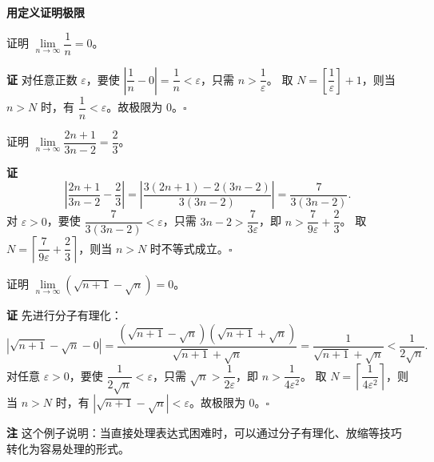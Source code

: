 \documentclass[fontset=fandol]{ctexart}
\newenvironment{custom}[1]{\par\noindent\textbf{#1}\quad}{\par\vspace{0.8em}}
\newenvironment{remark}{\par\noindent\textbf{注}\quad}{\par\vspace{0.8em}}
\begin{document}
\fi







\textbf{用定义证明极限}

\begin{example}
证明 \(\lim\limits_{n\to\infty} \dfrac{1}{n} = 0\)。
\end{example}
\begin{custom}{证}
对任意正数 \(\varepsilon \)，要使 \(\left|\dfrac{1}{n} - 0\right| = \dfrac{1}{n} < \varepsilon\)，只需 \(n > \dfrac{1}{\varepsilon}\)。
取 \(N = \left[ \dfrac{1}{\varepsilon} \right] + 1\)，则当 \(n > N\) 时，有 \(\dfrac{1}{n} < \varepsilon\)。故极限为 0。\(\square\)
\end{custom}

\begin{example}
证明 \(\lim\limits_{n\to\infty} \dfrac{2n+1}{3n-2} = \dfrac{2}{3}\)。
\end{example}
\begin{custom}{证}
\[
\left|\dfrac{2n+1}{3n-2} - \dfrac{2}{3}\right| = \left|\dfrac{3(2n+1)-2(3n-2)}{3(3n-2)}\right| = \dfrac{7}{3(3n-2)}.
\]
对 \(\varepsilon > 0\)，要使 \(\dfrac{7}{3(3n-2)} < \varepsilon\)，只需 \(3n-2 > \dfrac{7}{3\varepsilon}\)，即 \(n > \dfrac{7}{9\varepsilon} + \dfrac{2}{3}\)。
取 \(N = \left\lceil \dfrac{7}{9\varepsilon} + \dfrac{2}{3} \right\rceil\)，则当 \(n > N\) 时不等式成立。\(\square\)
\end{custom}

\begin{example}
证明 \(\lim\limits_{n\to\infty} \left(\sqrt{n+1} - \sqrt{n}\right) = 0\)。
\end{example}
\begin{custom}{证}
先进行分子有理化：
\[
\left|\sqrt{n+1} - \sqrt{n} - 0\right| = \dfrac{(\sqrt{n+1} - \sqrt{n})(\sqrt{n+1} + \sqrt{n})}{\sqrt{n+1} + \sqrt{n}} = \dfrac{1}{\sqrt{n+1} + \sqrt{n}} < \dfrac{1}{2\sqrt{n}}.
\]
对任意 \(\varepsilon > 0\)，要使 \(\dfrac{1}{2\sqrt{n}} < \varepsilon\)，只需 \(\sqrt{n} > \dfrac{1}{2\varepsilon}\)，即 \(n > \dfrac{1}{4\varepsilon^2}\)。
取 \(N = \left\lceil \dfrac{1}{4\varepsilon^2} \right\rceil\)，则当 \(n > N\) 时，有 \(\left|\sqrt{n+1} - \sqrt{n}\right| < \varepsilon\)。故极限为 0。\(\square\)
\end{custom}

\begin{remark}
这个例子说明：当直接处理表达式困难时，可以通过分子有理化、放缩等技巧转化为容易处理的形式。
\end{remark}
\end{document}

